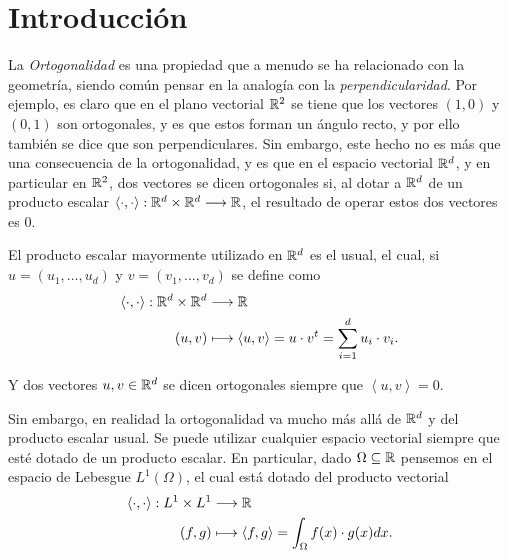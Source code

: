

\section{Introducción}
\label{c1section:intro}

La \textit{Ortogonalidad} es una propiedad que a menudo se ha relacionado con la geometría, siendo común pensar en la analogía con la \textit{perpendicularidad}. Por ejemplo, es claro que en el plano vectorial $\mathbb{R}^2$ se tiene que los vectores $(1,0)$ y $(0,1)$ son ortogonales, y es que estos forman un ángulo recto, y por ello también se dice que son perpendiculares. Sin embargo, este hecho no es más que una consecuencia de la ortogonalidad, y es que en el espacio vectorial $\mathbb{R}^d$, y en particular en $\mathbb{R}^2$, dos vectores se dicen ortogonales si, al dotar a $\mathbb{R}^d$ de un producto escalar $\left\langle\cdot,\cdot\right\rangle:\mathbb{R}^d\times\mathbb{R}^d\longrightarrow \mathbb{R}$, el resultado de operar estos dos vectores es $0$.

El producto escalar mayormente utilizado en $\mathbb{R}^d$ es el usual, el cual, si $u=(u_1,\dots,u_d)$ y $v=(v_1,\dots,v_d)$ se define como
\begin{equation*}
    \begin{split}
        \left\langle\cdot,\cdot\right\rangle:\mathbb{R}^d\times\mathbb{R}^d &\longrightarrow \mathbb{R} \\
        (u,v)&\longmapsto \left\langle u, v \right\rangle=u\cdot v^t = \sum_{i=1}^d u_i\cdot v_i.
    \end{split}
\end{equation*}

Y dos vectores $u,v\in\mathbb{R}^d$ se dicen ortogonales siempre que $\left\langle u, v \right\rangle=0$.

Sin embargo, en realidad la ortogonalidad va mucho más allá de $\mathbb{R}^d$ y del producto escalar usual. Se puede utilizar cualquier espacio vectorial siempre que esté dotado de un producto escalar. En particular, dado $\Omega\subseteq \mathbb{R}$ pensemos en el espacio de Lebesgue $L^1(\Omega)$, el cual está dotado del producto vectorial
\begin{equation*}
    \begin{split}
        \left\langle\cdot,\cdot\right\rangle:L^1\times L^1 &\longrightarrow \mathbb{R} \\
        (f,g)&\longmapsto \left\langle f,g \right\rangle=\int_{\Omega}f(x)\cdot g(x)dx .
    \end{split}
\end{equation*}

